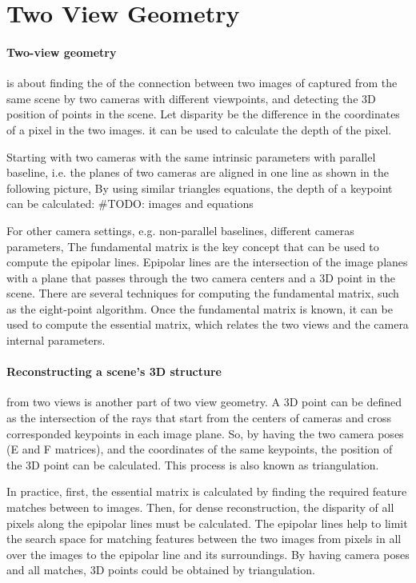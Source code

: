 \documentclass[11pt]{article}
\begin{document}
    \section{Two View Geometry}

    \paragraph{Two-view geometry} is about finding the of the connection between two images of captured from the same scene
    by two cameras with different viewpoints, and detecting the 3D position of points in the scene.
    Let disparity be the difference in the coordinates of a pixel in the two images. it can be used to calculate
    the depth of the pixel.

    Starting with two cameras with the same intrinsic parameters with parallel baseline, i.e. the planes of
    two cameras are aligned in one line as shown in the following picture, By using similar triangles equations,
    the depth of a keypoint can be calculated:
    #TODO: images and equations

    For other camera settings, e.g. non-parallel baselines, different cameras parameters, The fundamental matrix
    is the key concept that can be used to compute the epipolar lines. Epipolar lines are the intersection of
    the image planes with a plane that passes through the two camera centers and a 3D point in the scene.
    There are several techniques for computing the fundamental matrix, such as the eight-point algorithm.
    Once the fundamental matrix is known, it can be used to compute the essential matrix, which relates the
    two views and the camera internal parameters.

    \paragraph{Reconstructing a scene's 3D structure} from two views is another part of two view geometry.
    A 3D point can be defined as the intersection of the rays that start from the centers of cameras and
    cross corresponded keypoints in each image plane. So, by having the two camera poses (E and F matrices),
    and the coordinates of the same keypoints, the position of the 3D point can be calculated. This process
    is also known as triangulation.

    In practice, first, the essential matrix is calculated by finding the required feature matches between
    to images. Then, for dense reconstruction, the disparity of all pixels along the epipolar lines must be
    calculated. The epipolar lines help to limit the search space for matching features between the two images
    from pixels in all over the images to the epipolar line and its surroundings. By having camera poses and all
    matches, 3D points could be obtained by triangulation.
\end{document}
